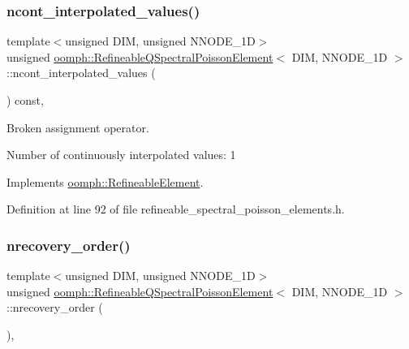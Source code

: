 \subsubsection{\texorpdfstring{ncont\+\_\+interpolated\+\_\+values()}{ncont\_interpolated\_values()}}
{\footnotesize\ttfamily template$<$unsigned D\+IM, unsigned N\+N\+O\+D\+E\+\_\+1D$>$ \\
unsigned \hyperlink{classoomph_1_1RefineableQSpectralPoissonElement}{oomph\+::\+Refineable\+Q\+Spectral\+Poisson\+Element}$<$ D\+IM, N\+N\+O\+D\+E\+\_\+1D $>$\+::ncont\+\_\+interpolated\+\_\+values (\begin{DoxyParamCaption}{ }\end{DoxyParamCaption}) const\hspace{0.3cm}{\ttfamily [inline]}, {\ttfamily [virtual]}}



Broken assignment operator. 

Number of continuously interpolated values\+: 1 

Implements \hyperlink{classoomph_1_1RefineableElement_a53e171a18c9f43f1db90a6876516a073}{oomph\+::\+Refineable\+Element}.



Definition at line 92 of file refineable\+\_\+spectral\+\_\+poisson\+\_\+elements.\+h.

\mbox{\label{classoomph_1_1RefineableQSpectralPoissonElement_a3fec9c4202b17052d7425c6d89d5b745}} 
\subsubsection{\texorpdfstring{nrecovery\+\_\+order()}{nrecovery\_order()}}
{\footnotesize\ttfamily template$<$unsigned D\+IM, unsigned N\+N\+O\+D\+E\+\_\+1D$>$ \\
unsigned \hyperlink{classoomph_1_1RefineableQSpectralPoissonElement}{oomph\+::\+Refineable\+Q\+Spectral\+Poisson\+Element}$<$ D\+IM, N\+N\+O\+D\+E\+\_\+1D $>$\+::nrecovery\+\_\+order (\begin{DoxyParamCaption}{ }\end{DoxyParamCaption})\hspace{0.3cm}{\ttfamily [inline]}, {\ttfamily [virtual]}}



